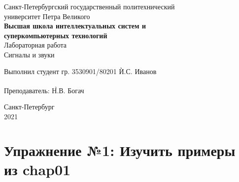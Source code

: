 \documentclass[a4]{article}
\begin{document}
    \begin{center}
        \begin{center}
            \hfill \break
            \normalsize{Санкт-Петербургский государственный политехнический}\\
            \normalsize{университет Петра Великого}\\
            \hfill \break
            \normalsize{\textbf{Высшая школа интеллектуальных систем и}}\\
            \normalsize{\textbf{суперкомпьютерных технологий}}\\
            \hfill \break
            \hfill \break
            \hfill \break
            \normalsize{Лабораторная работа}\\
            \hfill \break
            \normalsize{\LARGE Сигналы и звуки}\\
        \end{center}
        \hfill \break
        \hfill \break
        \hfill \break
        \hfill \break
        \hfill \break
        \hfill \break
        \hfill \break
        \hfill \break
        \hfill \break
        \hfill \break
        \begin{tabbing}
            Выполнил студент гр. 3530901/80201 \`И.С. Иванов\\
            \\
            Преподаватель: \`Н.В. Богач\\
        \end{tabbing}
        \hfill \break
        \hfill \break
        \hfill \break
        \hfill \break
        \begin{center}
            Санкт-Петербург\\
            2021
        \end{center}
        \thispagestyle{empty}
    \end{center}

    \newpage
    \tableofcontents

    \newpage
    \listoffigures

    \newpage
    \lstlistoflistings

    \newpage


    \section{Упражнение №1: Изучить примеры из chap01}
    \label{sec:1_study_examples}
\end{document}

